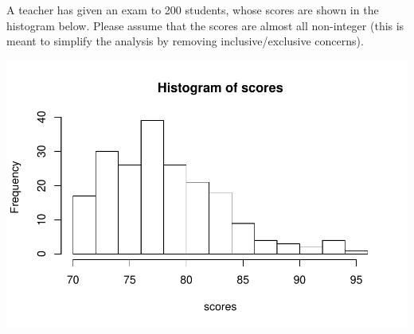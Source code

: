 \documentclass[12pt,letterpaper,addpoints]{exam}
\begin{document}
\begin{questions}

\newpage

\question[10] A teacher has given an exam to 200 students, whose scores are shown in the histogram below. Please assume that the scores are almost all non-integer (this is meant to simplify the analysis by removing inclusive/exclusive concerns).
\vspace{-30pt}
\begin{center}
\includegraphics[scale=1]{figures/scores.pdf}
\end{center}
\end{questions}
\end{document}

